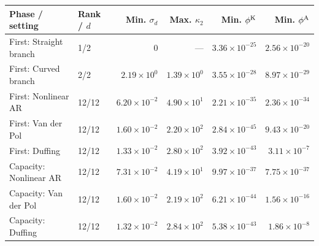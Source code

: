 \begin{tabular}{llrrrr}
\toprule
Phase / setting & Rank / $d$ & Min. $\sigma_d$ & Max. $\kappa_2$ & Min. $\phi^{\mathrm{K}}$ & Min. $\phi^{\mathrm{A}}$ \\
\midrule
First: Straight branch & 1/2 & $0$ & --- & $3.36\times10^{-25}$ & $2.56\times10^{-20}$ \\
First: Curved branch & 2/2 & $2.19\times10^{0}$ & $1.39\times10^{0}$ & $3.55\times10^{-28}$ & $8.97\times10^{-29}$ \\
First: Nonlinear AR & 12/12 & $6.20\times10^{-2}$ & $4.90\times10^{1}$ & $2.21\times10^{-35}$ & $2.36\times10^{-34}$ \\
First: Van der Pol & 12/12 & $1.60\times10^{-2}$ & $2.20\times10^{2}$ & $2.84\times10^{-45}$ & $9.43\times10^{-20}$ \\
First: Duffing & 12/12 & $1.33\times10^{-2}$ & $2.80\times10^{2}$ & $3.92\times10^{-43}$ & $3.11\times10^{-7}$ \\
Capacity: Nonlinear AR & 12/12 & $7.31\times10^{-2}$ & $4.19\times10^{1}$ & $9.97\times10^{-37}$ & $7.75\times10^{-37}$ \\
Capacity: Van der Pol & 12/12 & $1.60\times10^{-2}$ & $2.19\times10^{2}$ & $6.21\times10^{-44}$ & $1.56\times10^{-16}$ \\
Capacity: Duffing & 12/12 & $1.32\times10^{-2}$ & $2.84\times10^{2}$ & $5.38\times10^{-43}$ & $1.86\times10^{-8}$ \\
\bottomrule
\end{tabular}
